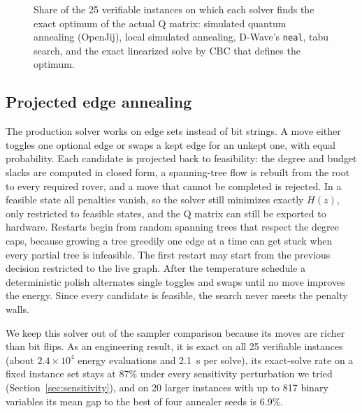 \documentclass[11pt]{article}
\newcommand{\code}[1]{\texttt{#1}}
\begin{document}
\begin{figure}[t]
\centering
{}
\caption{Share of the 25 verifiable instances on which each solver finds the
exact optimum of the actual Q matrix: simulated quantum annealing (OpenJij),
local simulated annealing, D-Wave's \code{neal}, tabu search, and the exact
linearized solve by CBC that defines the optimum.}
\label{fig:solvers}
\end{figure}

\subsection{Projected edge annealing}

The production solver works on edge sets instead of bit strings. A move
either toggles one optional edge or swaps a kept edge for an unkept one, with
equal probability. Each candidate is projected back to feasibility: the degree
and budget slacks are computed in closed form, a spanning-tree flow is rebuilt
from the root to every required rover, and a move that cannot be completed is
rejected. In a feasible state all penalties vanish, so the solver still
minimizes exactly $H(z)$, only restricted to feasible states, and the Q matrix
can still be exported to hardware. Restarts begin from random spanning trees
that respect the degree caps, because growing a tree greedily one edge at a
time can get stuck when every partial tree is infeasible. The first restart may
start from the previous decision restricted to the live graph. After the
temperature schedule a deterministic polish alternates single toggles and
swaps until no move improves the energy. Since every candidate is feasible,
the search never meets the penalty walls.

We keep this solver out of the sampler comparison because its moves are
richer than bit flips. As an engineering result, it is exact on all 25
verifiable instances (about $2.4\times10^4$ energy evaluations and 2.1~s per
solve), its exact-solve rate on a fixed instance set stays at 87\% under every
sensitivity perturbation we tried (Section~\ref{sec:sensitivity}), and on 20
larger instances with up to 817 binary variables its mean gap to the best of
four annealer seeds is 6.9\%.
\end{document}
